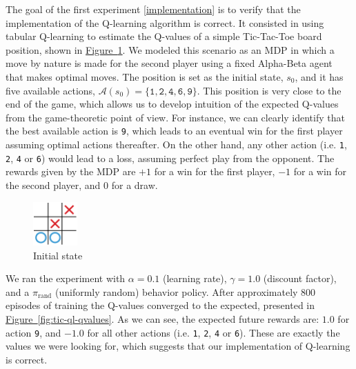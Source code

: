 \documentclass{article}
\newcommand{\GithubURL}[1]{[\href{https://github.com/davidrobles/mlnd-capstone-code/blob/master/#1}{implementation}]}
\begin{document}
The goal of the first experiment \GithubURL{experiments/tic_ql_tab_simple.py} is to verify that the
implementation of the Q-learning algorithm is correct. It consisted in using tabular Q-learning to
estimate the Q-values of a simple Tic-Tac-Toe board position, shown in \hyperref[fig:tic-ql-tab-cur]
{Figure~\ref*{fig:tic-ql-tab-cur}}. We modeled this scenario as an MDP in which a move by nature is
made for the second player using a fixed Alpha-Beta agent that makes optimal moves. The position is
set as the initial state, $s_0$, and it has five available actions, $\mathcal{A}(s_0) =
\{\texttt{1}, \texttt{2}, \texttt{4}, \texttt{6}, \texttt{9}\}$. This position is very close to the
end of the game, which allows us to develop intuition of the expected Q-values from the
game-theoretic point of view. For instance, we can clearly identify that the best available action
is \texttt{9}, which leads to an eventual win for the first player assuming optimal actions
thereafter. On the other hand, any other action (i.e.  \texttt{1}, \texttt{2}, \texttt{4} or
\texttt{6}) would lead to a loss, assuming perfect play from the opponent.  The rewards given by the
MDP are $+1$ for a win for the first player, $-1$ for a win for the second player, and $0$ for a
draw.


\begin{figure}[!h]
    \centering
    \includegraphics[width=0.15\textwidth]{figures/tic_ql_tab_current.pdf}
    \caption{Initial state}
    \label{fig:tic-ql-tab-cur}
\end{figure}

We ran the experiment with $\alpha = 0.1$ (learning rate), $\gamma=1.0$ (discount factor), and a
$\pi_{\textrm{rand}}$ (uniformly random) behavior policy. After approximately 800 episodes of
training the Q-values converged to the expected, presented in \hyperref[fig:tic-ql-qvalues]
{Figure~\ref*{fig:tic-ql-qvalues}}. As we can see, the expected future rewards are: $1.0$ for action
\texttt{9}, and $-1.0$ for all other actions (i.e. \texttt{1}, \texttt{2}, \texttt{4} or
\texttt{6}). These are exactly the values we were looking for, which suggests that our
implementation of Q-learning is correct.

\end{document}
